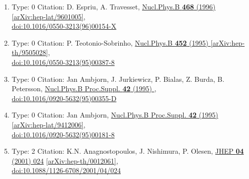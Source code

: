 \documentclass[a4paper,10pt]{article}
\begin{document}
\begin{enumerate}
\begin{enumerate}
  \item Type: 0 Citation: D. Espriu, A. Travesset, \href{https://www.doi.org/10.1016/0550-3213(96)00154-X}{Nucl.Phys.B {\bf 468} (1996) }  \href{https://arxiv.org/abs/hep-lat/9601005}{[arXiv:hep-lat/9601005]},\\\href{https://www.doi.org/10.1016/0550-3213(96)00154-X}{doi:10.1016/0550-3213(96)00154-X}
  \item Type: 0 Citation: P. Teotonio-Sobrinho, \href{https://www.doi.org/10.1016/0550-3213(95)00387-8}{Nucl.Phys.B {\bf 452} (1995) }  \href{https://arxiv.org/abs/hep-th/9505028}{[arXiv:hep-th/9505028]},\\\href{https://www.doi.org/10.1016/0550-3213(95)00387-8}{doi:10.1016/0550-3213(95)00387-8}
  \item Type: 0 Citation: Jan Ambjorn, J. Jurkiewicz, P. Bialas, Z. Burda, B. Petersson, \href{https://www.doi.org/10.1016/0920-5632(95)00355-D}{Nucl.Phys.B Proc.Suppl. {\bf 42} (1995) },\\\href{https://www.doi.org/10.1016/0920-5632(95)00355-D}{doi:10.1016/0920-5632(95)00355-D}
  \item Type: 0 Citation: Jan Ambjorn, \href{https://www.doi.org/10.1016/0920-5632(95)00181-8}{Nucl.Phys.B Proc.Suppl. {\bf 42} (1995) }  \href{https://arxiv.org/abs/hep-lat/9412006}{[arXiv:hep-lat/9412006]},\\\href{https://www.doi.org/10.1016/0920-5632(95)00181-8}{doi:10.1016/0920-5632(95)00181-8}
  \item Type: 2 Citation: K.N. Anagnostopoulos, J. Nishimura, P. Olesen, \href{https://www.doi.org/10.1088/1126-6708/2001/04/024}{JHEP {\bf 04} (2001) 024}  \href{https://arxiv.org/abs/hep-th/0012061}{[arXiv:hep-th/0012061]},\\\href{https://www.doi.org/10.1088/1126-6708/2001/04/024}{doi:10.1088/1126-6708/2001/04/024}

\end{enumerate}
\end{enumerate}
\end{document}
